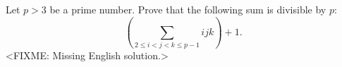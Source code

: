\problem{}
Let $p > 3$ be a prime number.
Prove that the following sum is divisible by  $p$:
\[
    \left(
        \sum_{2 \leq i < j < k \leq p-1}
            i j k
    \right)
    + 1
.\]
\solution
<FIXME: Missing English solution.>
\endproblem
